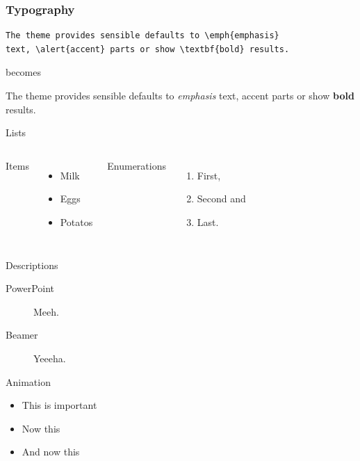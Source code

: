 \documentclass[10pt, compress]{beamer}
\begin{document}
\begin{frame}[fragile]
  \frametitle{Typography}
      \begin{verbatim}
The theme provides sensible defaults to \emph{emphasis}
text, \alert{accent} parts or show \textbf{bold} results.
      \end{verbatim}

  \begin{center}becomes\end{center}

  The theme provides sensible defaults to \emph{emphasis} text,
  \alert{accent} parts or show \textbf{bold} results.
\end{frame}
\begin{frame}{Lists}
  \begin{columns}[onlytextwidth]
      Items
      \begin{itemize}
        \item Milk \item Eggs \item Potatos
      \end{itemize}

      Enumerations
      \begin{enumerate}
        \item First, \item Second and \item Last.
      \end{enumerate}
  \end{columns}
\end{frame}
\begin{frame}{Descriptions}
  \begin{description}
    \item[PowerPoint] Meeh.
    \item[Beamer] Yeeeha.
  \end{description}
\end{frame}
\begin{frame}{Animation}
  \begin{itemize}[<+- | alert@+>]
    \item \alert<4>{This is important}
    \item Now this
    \item And now this
  \end{itemize}
\end{frame}
\end{document}
